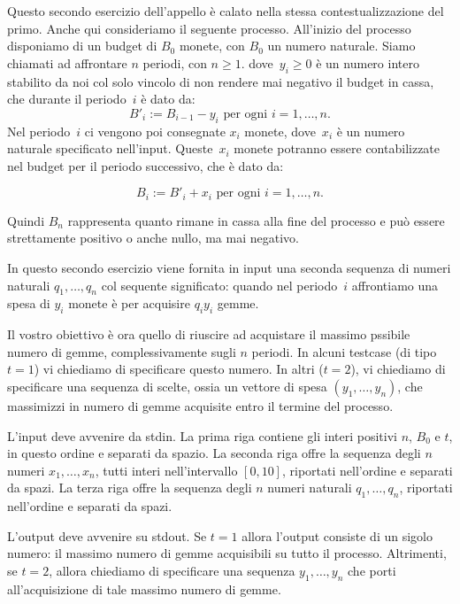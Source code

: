 \renewcommand{\nomebreve}{online\_budget\_opt}
\renewcommand{\titolo}{Optimal management of a never negative budget}

\introduzione{}

Questo secondo esercizio dell'appello è calato nella stessa contestualizzazione del primo.
Anche qui consideriamo il seguente processo.
All'inizio del processo disponiamo di un budget di $B_0$ monete, con $B_0$ un numero naturale.
Siamo chiamati ad affrontare $n$ periodi, con $n \geq 1$.
dove~$y_i\geq 0$ è un numero intero stabilito da noi col solo vincolo di non rendere mai negativo
il budget in cassa, che durante il periodo~$i$ è dato da:
\[
   B'_{i} := B_{i-1}  - y_{i} \mbox{ per ogni $i=1,\ldots, n$.}
\]  
Nel periodo~$i$ ci vengono poi consegnate $x_i$ monete, dove~$x_i$ è un numero naturale specificato nell'input. Queste~$x_i$ monete potranno essere contabilizzate nel budget per il periodo successivo, che è dato da:

\[
   B_{i} := B'_{i} + x_{i} \mbox{ per ogni $i=1,\ldots, n$.}
\]

Quindi $B_n$ rappresenta quanto rimane in cassa alla fine del processo e può essere strettamente positivo o anche nullo, ma mai negativo.

In questo secondo esercizio viene fornita in input una seconda sequenza di numeri naturali $q_1, \ldots, q_n$ col sequente significato:
quando nel periodo~$i$ affrontiamo una spesa di $y_i$ monete
è per acquisire $q_i y_i$ gemme.  

Il vostro obiettivo è ora quello di riuscire ad acquistare il massimo pssibile numero di gemme, complessivamente sugli $n$ periodi.
In alcuni testcase (di tipo $t=1$) vi chiediamo di specificare questo numero.
In altri ($t=2$), vi chiediamo di specificare una sequenza di scelte, ossia un vettore di spesa  $(y_1, \ldots, y_n)$, che massimizzi in numero di gemme acquisite entro il termine del processo. 

L'input deve avvenire da stdin.
La prima riga contiene gli interi positivi $n$, $B_0$ e $t$, in questo ordine e separati da spazio.
La seconda riga offre la sequenza degli $n$ numeri $x_1, \ldots, x_n$, tutti interi nell'intervallo $[0, 10]$, riportati nell'ordine e separati da spazi.
La terza riga offre la sequenza degli $n$ numeri naturali $q_1, \ldots, q_n$, riportati nell'ordine e separati da spazi.

L'output deve avvenire su stdout.
Se $t=1$ allora l'output consiste di un sigolo numero: il massimo numero di gemme acquisibili su tutto il processo.
Altrimenti, se $t=2$, allora chiediamo di specificare una sequenza $y_1, \ldots, y_n$ che porti all'acquisizione di tale massimo numero di gemme.


